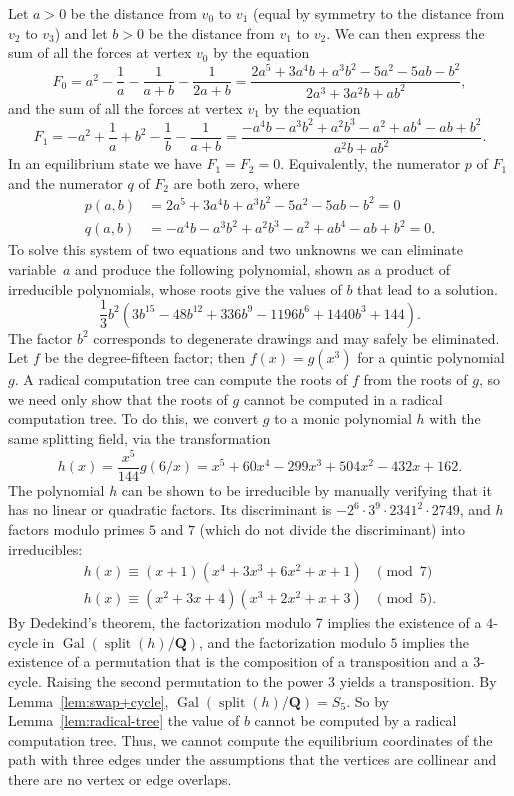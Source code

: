 \documentclass[oribibl,10pt]{llncs}
\newcommand{\rationals}{\mathbf{Q}}
\DeclareMathOperator{\Gal}{Gal}
\DeclareMathOperator{\splitting}{split}
\begin{document}
Let $a > 0$ be the distance from $v_0$ to $v_1$ (equal by symmetry to the distance from $v_2$ to $v_3$) and let $b > 0$ be the distance from $v_1$ to $v_2$. We can then express the sum of all the forces at vertex $v_0$ by the equation
\[F_0 = a^2
-\frac{1}{a}
-\frac{1}{a+b}
-\frac{1}{2a+b}
=
\frac{2a^5 + 3a^4b + a^3b^2 - 5a^2 - 5ab - b^2}{2a^3 + 3a^2b + ab^2},
\]
and the sum of all the forces at vertex $v_1$ by the equation
\[
F_1 = 
-a^2
+\frac{1}{a}
+b^2
-\frac{1}{b}
-\frac{1}{a+b}
=
\frac{-a^4b - a^3b^2 + a^2b^3 - a^2 + ab^4 - ab + b^2}{a^2b + ab^2}.
\]
In an equilibrium state we have $F_1 = F_2 = 0$. Equivalently, the numerator $p$ of $F_1$ and the numerator $q$ of $F_2$ are both zero, where
\begin{align*}
p(a,b) &= 2a^5 + 3a^4b + a^3b^2 - 5a^2 - 5ab - b^2 = 0 \\
q(a,b) &= -a^4b - a^3b^2 + a^2b^3 - a^2 + ab^4 - ab + b^2 = 0.
\end{align*}
To solve this system of two equations and two unknowns we can eliminate variable~$a$ and produce the following polynomial, shown as a product of irreducible polynomials, whose roots give the values of $b$ that lead to a solution.
\[
\frac{1}{3} b^2 (3b^{15} - 48b^{12} + 336b^9 - 1196b^6 + 1440b^3 + 144).
\]
The factor $b^2$ corresponds to degenerate drawings and may safely be eliminated.
Let $f$ be the degree-fifteen factor; then $f(x)=g(x^3)$ for a quintic polynomial~$g$. A radical computation tree can compute the roots of $f$ from the roots of $g$, so we need only show that the roots of $g$ cannot be computed in a radical computation tree. To do this, we convert $g$ to a monic polynomial $h$ with the same splitting field, via the transformation
\[
h(x) =\frac{x^5}{144} g(6/x) = x^5 + 60x^4 - 299x^3 + 504x^2 - 432x + 162.
\]
The polynomial $h$ can be shown to be irreducible by manually verifying that it has no linear or quadratic factors. Its discriminant is $-2^6 \cdot 3^9 \cdot 2341^2 \cdot 2749$, and $h$ factors modulo primes $5$ and $7$ (which do not divide the discriminant) into irreducibles:
\begin{align*}
h(x) \equiv (x + 1)  (x^4 + 3x^3 + 6x^2 + x + 1)&\pmod{7}\\
h(x) \equiv (x^2 + 3x + 4)  (x^3 + 2x^2 + x + 3) &\pmod{5}.
\end{align*}
By Dedekind's theorem, the factorization modulo 7 implies the existence of a $4$-cycle in $\Gal(\splitting(h)/\rationals)$, and the factorization modulo $5$ implies the existence of a permutation that is the composition of a transposition and a $3$-cycle.
 Raising the second permutation to the power $3$ yields a transposition. 
By Lemma~\ref{lem:swap+cycle}, $\Gal(\splitting(h)/\rationals) = S_5$. 
So by Lemma~\ref{lem:radical-tree} the value of $b$ cannot be computed by a radical computation tree. 
Thus, we cannot compute the equilibrium coordinates of the path with three edges under the assumptions that the vertices are collinear and there are no vertex or edge overlaps.
\end{document}
